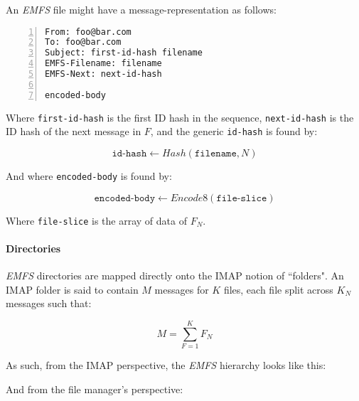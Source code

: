 \documentclass[12pt]{article}
\begin{document}
An \textit{EMFS} file might have a message-representation as follows:

\begin{lstlisting}[caption=EMFS Message,numbers=left,showspaces=true,label={messagerep}]
From: foo@bar.com
To: foo@bar.com
Subject: first-id-hash filename
EMFS-Filename: filename
EMFS-Next: next-id-hash

encoded-body
\end{lstlisting}

Where \texttt{first-id-hash} is the first ID hash in the sequence,
\texttt{next-id-hash} is the ID hash of the next message in $F$, and the
generic \texttt{id-hash} is found by:

$$
\texttt{id-hash} \gets \mathit{Hash}(\texttt{filename}, \mathit{N})
$$

And where \texttt{encoded-body} is found by:

$$
\texttt{encoded-body} \gets \mathit{Encode8}(\texttt{file-slice})
$$

Where \texttt{file-slice} is the array of data of $F_{N}$.

\paragraph{Directories}

\textit{EMFS} directories are mapped directly onto the IMAP notion of
``folders". An IMAP folder is said to contain $M$ messages for $K$ files, each
file split across $K_{N}$ messages such that:

$$
M = \sum_{F=1}^{K} F_{N}
$$

As such, from the IMAP perspective, the \textit{EMFS} hierarchy looks like this:


And from the file manager's perspective:

\end{document}
